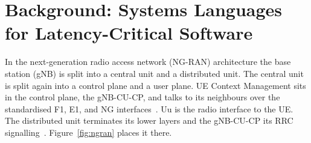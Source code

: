 \documentclass[english,twoside,openright,a4paper,censored,csm,software-track-2020]{HYthesisML}
\begin{document}
\chapter{Background: Systems Languages for Latency-Critical Software\label{chapter:background}}

In the next-generation radio access network (NG-RAN) architecture the base station (gNB) is
split into a central unit and a distributed unit. The central unit is split again into a control plane and a user plane.
UE Context Management sits in the control plane, the gNB-CU-CP, and talks to its
neighbours over the standardised F1, E1, and NG interfaces~\cite{3gpp38401}. Uu is the radio
interface to the UE. The distributed unit terminates its lower layers and the gNB-CU-CP its
RRC signalling~\cite{3gpp38401}.
Figure~\ref{fig:ngran} places it there.
\end{document}
